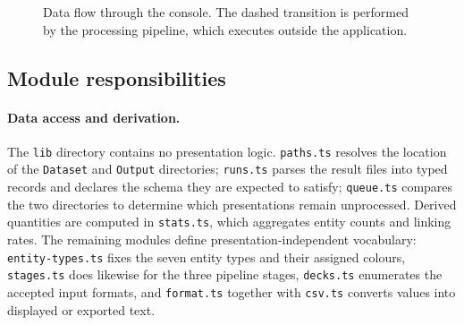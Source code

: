 \documentclass[11pt,a4paper]{article}
\begin{document}
\begin{figure}[!ht]
\centering
{}
\caption{Data flow through the console. The dashed transition is performed by the
processing pipeline, which executes outside the application.}
\label{fig:flow}
\end{figure}

\subsection{Module responsibilities}

\paragraph{Data access and derivation.}
The \texttt{lib} directory contains no presentation logic. \texttt{paths.ts}
resolves the location of the \texttt{Dataset} and \texttt{Output} directories;
\texttt{runs.ts} parses the result files into typed records and declares the
schema they are expected to satisfy; \texttt{queue.ts} compares the two
directories to determine which presentations remain unprocessed. Derived quantities are
computed in \texttt{stats.ts}, which aggregates entity counts and linking rates.
The remaining modules define presentation-independent vocabulary:
\texttt{entity-types.ts} fixes the seven entity types and their assigned colours,
\texttt{stages.ts} does likewise for the three pipeline stages, \texttt{decks.ts}
enumerates the accepted input formats, and \texttt{format.ts} together with
\texttt{csv.ts} converts values into displayed or exported text.
\end{document}
